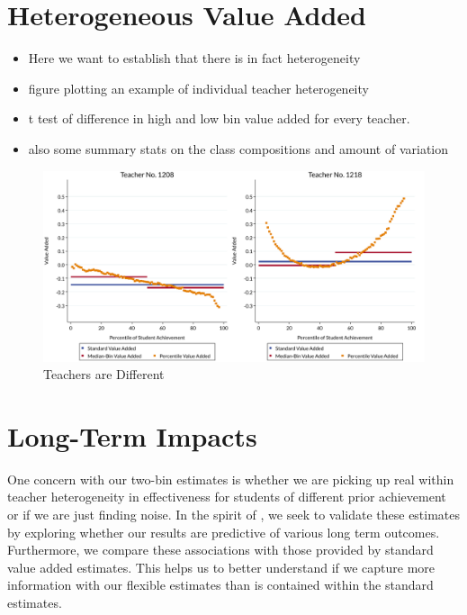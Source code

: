 \documentclass{article}
\theoremstyle{definition}
\theoremstyle{definition}
\theoremstyle{definition}
\theoremstyle{definition}
\begin{document}
\section{Heterogeneous Value Added} \label{hetva}
  
  \begin{itemize}
      \item Here we want to establish that there is in fact heterogeneity 
      \item figure plotting an example of individual teacher heterogeneity 
      \item t test of difference in high and low bin value added for every teacher. 
      \item also some summary stats on the class compositions and amount of variation 
  \end{itemize}  
    
    \begin{figure}
        \begin{center}
        \includegraphics[width=.85\textwidth]{slides/slides_pffls/fig1_heterogeneity.pdf}
        \end{center}
        
            \caption{Teachers are Different}
            \label{fig:my_label}
    \end{figure}
    

\section{Long-Term Impacts} \label{long}

One concern with our two-bin estimates is whether we are picking up real within teacher heterogeneity in effectiveness for students of different prior achievement or if we are just finding noise. In the spirit of \cite{chetty2014measuring2}, we seek to validate these estimates by exploring whether our results are predictive of various long term outcomes. Furthermore, we compare these associations with those provided by standard value added estimates. This helps us to better understand if we capture more information with our flexible estimates than is contained within the standard estimates.
\end{document}
